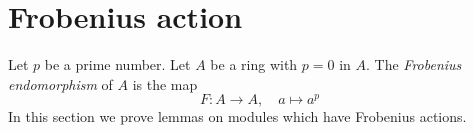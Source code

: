 \section{Frobenius action}
\label{section-frobenius}

\noindent
Let $p$ be a prime number. Let $A$ be a ring with $p = 0$ in $A$.
The {\it Frobenius endomorphism} of $A$ is the map
$$
F : A \longrightarrow A,
\quad
a \longmapsto a^p
$$
In this section we prove lemmas on modules which have
Frobenius actions.

